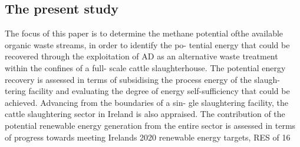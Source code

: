\subsection{The present study}
The focus of this paper is to determine the methane potential ofthe available organic waste streams, in order to identify the po- tential energy that could be recovered through the exploitation of AD as an alternative waste treatment within the confines of a full- scale cattle slaughterhouse. The potential energy recovery is assessed in terms of subsidising the process energy of the slaugh- tering facility and evaluating the degree of energy self-sufficiency that could be achieved. Advancing from the boundaries of a sin- gle slaughtering facility, the cattle slaughtering sector in Ireland is also appraised. The contribution of the potential renewable energy generation from the entire sector is assessed in terms of progress towards meeting Irelands 2020 renewable energy targets, RES of 16%